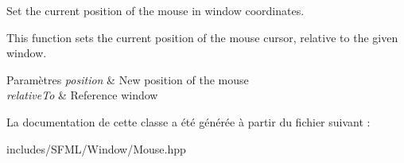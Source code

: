 Set the current position of the mouse in window coordinates. 

This function sets the current position of the mouse cursor, relative to the given window.


\begin{DoxyParams}{Paramètres}
{\em position} & New position of the mouse \\
\hline
{\em relative\+To} & Reference window \\
\hline
\end{DoxyParams}


La documentation de cette classe a été générée à partir du fichier suivant \+:\begin{DoxyCompactItemize}
\item 
includes/\+S\+F\+M\+L/\+Window/Mouse.\+hpp\end{DoxyCompactItemize}
